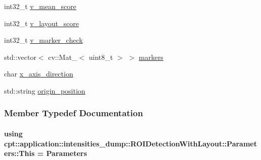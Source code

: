 \begin{DoxyCompactItemize}
\item 
int32\-\_\-t \hyperlink{structcpt_1_1application_1_1intensities__dump_1_1_r_o_i_detection_with_layout_1_1_parameters_aa1b287fe2b354589b812585ecb2caab9}{v\-\_\-mean\-\_\-score}
\item 
int32\-\_\-t \hyperlink{structcpt_1_1application_1_1intensities__dump_1_1_r_o_i_detection_with_layout_1_1_parameters_a1e780905393a280ada64dde948832690}{v\-\_\-layout\-\_\-score}
\item 
int32\-\_\-t \hyperlink{structcpt_1_1application_1_1intensities__dump_1_1_r_o_i_detection_with_layout_1_1_parameters_a2f211b55932b7e6bcc7c714f3c87f694}{v\-\_\-marker\-\_\-check}
\item 
std\-::vector$<$ cv\-::\-Mat\-\_\-$<$ uint8\-\_\-t $>$ $>$ \hyperlink{structcpt_1_1application_1_1intensities__dump_1_1_r_o_i_detection_with_layout_1_1_parameters_ab071f85bc945282ad4331caec5a9b227}{markers}
\item 
char \hyperlink{structcpt_1_1application_1_1intensities__dump_1_1_r_o_i_detection_with_layout_1_1_parameters_ab3090c5aa0f4a0207f74316cbca0eb41}{x\-\_\-axis\-\_\-direction}
\item 
std\-::string \hyperlink{structcpt_1_1application_1_1intensities__dump_1_1_r_o_i_detection_with_layout_1_1_parameters_adb4b9c9df0cdd86a37d1c7b029a86d67}{origin\-\_\-position}
\end{DoxyCompactItemize}


\subsubsection{Member Typedef Documentation}
\hypertarget{structcpt_1_1application_1_1intensities__dump_1_1_r_o_i_detection_with_layout_1_1_parameters_ae6af99063a7e34900e8023d6f3ef4d53}{
\paragraph[{This}]{\setlength{\rightskip}{0pt plus 5cm}using {\bf cpt\-::application\-::intensities\-\_\-dump\-::\-R\-O\-I\-Detection\-With\-Layout\-::\-Parameters\-::\-This} =  {\bf Parameters}}}\label{structcpt_1_1application_1_1intensities__dump_1_1_r_o_i_detection_with_layout_1_1_parameters_ae6af99063a7e34900e8023d6f3ef4d53}



